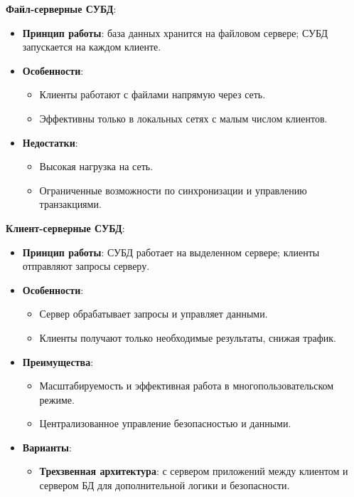 \documentclass[a4paper,12pt]{article}
\begin{document}
\textbf{Файл-серверные СУБД}:

\begin{itemize}
    \item \textbf{Принцип работы}: база данных хранится на файловом сервере; СУБД запускается на каждом клиенте.
    \item \textbf{Особенности}:
    \begin{itemize}
        \item Клиенты работают с файлами напрямую через сеть.
        \item Эффективны только в локальных сетях с малым числом клиентов.
    \end{itemize}
    \item \textbf{Недостатки}:
    \begin{itemize}
        \item Высокая нагрузка на сеть.
        \item Ограниченные возможности по синхронизации и управлению транзакциями.
    \end{itemize}
\end{itemize}

\textbf{Клиент-серверные СУБД}:

\begin{itemize}
    \item \textbf{Принцип работы}: СУБД работает на выделенном сервере; клиенты отправляют запросы серверу.
    \item \textbf{Особенности}:
    \begin{itemize}
        \item Сервер обрабатывает запросы и управляет данными.
        \item Клиенты получают только необходимые результаты, снижая трафик.
    \end{itemize}
    \item \textbf{Преимущества}:
    \begin{itemize}
        \item Масштабируемость и эффективная работа в многопользовательском режиме.
        \item Централизованное управление безопасностью и данными.
    \end{itemize}
    \item \textbf{Варианты}:
    \begin{itemize}
        \item \textbf{Трехзвенная архитектура}: с сервером приложений между клиентом и сервером БД для дополнительной логики и безопасности.
    \end{itemize}
\end{itemize}
\end{document}
